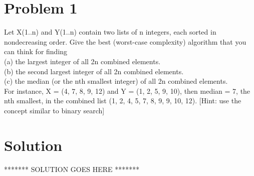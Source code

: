 


    \section*{Problem 1}
    \noindent
    Let X(1..n) and Y(1..n) contain two lists of n integers, each sorted in nondecreasing order. Give the best (worst-case complexity) algorithm that you can think for finding \\
    (a) the largest integer of all 2n combined elements.\\
    (b) the second largest integer of all 2n combined elements.\\
    (c) the median (or the nth smallest integer) of all 2n combined elements.\\
    For instance, X = (4, 7, 8, 9, 12) and Y = (1, 2, 5, 9, 10), then median = 7, the nth smallest, in the combined list (1, 2, 4, 5, 7, 8, 9, 9, 10, 12). [Hint: use the concept similar to binary search]

    \section*{Solution}
    ******* SOLUTION GOES HERE *******

